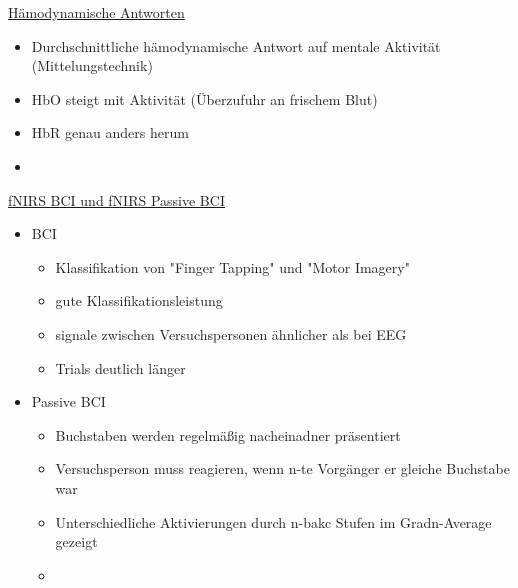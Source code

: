 \documentclass[a4paper,10pt,oneside]{article}
\begin{document}
\underline{Hämodynamische Antworten} \\
 	\begin{itemize}
 		\item Durchschnittliche hämodynamische Antwort auf mentale Aktivität (Mittelungstechnik)
 		\item HbO steigt mit Aktivität (Überzufuhr an frischem Blut)
 		\item HbR genau anders herum 
 		\item[] %
 	\end{itemize}
 	
\underline{fNIRS BCI und fNIRS Passive BCI} \\
 	\begin{itemize}
 		\item BCI
 			\begin{itemize}
 				\item Klassifikation von "Finger Tapping" und "Motor Imagery"
 				\item gute Klassifikationsleistung
 				\item signale zwischen Versuchspersonen ähnlicher als bei EEG
 				\item Trials deutlich länger
 			\end{itemize}
		\item Passive BCI
			\begin{itemize}
				\item Buchstaben werden regelmäßig nacheinadner präsentiert
				\item Versuchsperson muss reagieren, wenn n-te Vorgänger er gleiche Buchstabe war
				\item Unterschiedliche Aktivierungen durch n-bakc Stufen im Gradn-Average gezeigt
				\item[] %
			\end{itemize}
 	\end{itemize}
 		
 		
 		
 		
 		
 		
 		
 		
 		
 		
 		
 		
 		
 		
 		
 		
 		
 		
 		
 		
 		
 	

 
\end{document}
